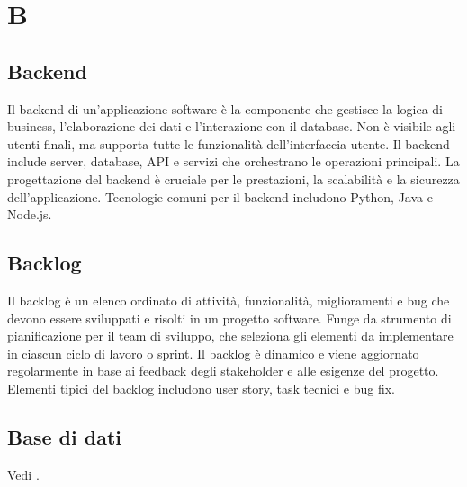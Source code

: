 \section{B}

\vspace{2em}
\subsection*{Backend}
\par Il backend di un'applicazione software è la componente che gestisce la logica di business, l'elaborazione dei dati e l'interazione con il database. Non è visibile agli utenti finali, ma supporta tutte le funzionalità dell'interfaccia utente. Il backend include server, database, API e servizi che orchestrano le operazioni principali. La progettazione del backend è cruciale per le prestazioni, la scalabilità e la sicurezza dell'applicazione. Tecnologie comuni per il backend includono Python, Java e Node.js.

\vspace{2em}
\subsection*{Backlog}
\par Il backlog è un elenco ordinato di attività, funzionalità, miglioramenti e bug che devono essere sviluppati e risolti in un progetto software. Funge da strumento di pianificazione per il team di sviluppo, che seleziona gli elementi da implementare in ciascun ciclo di lavoro o sprint. Il backlog è dinamico e viene aggiornato regolarmente in base ai feedback degli stakeholder e alle esigenze del progetto. Elementi tipici del backlog includono user story, task tecnici e bug fix.

\vspace{2em}
\subsection*{Base di dati}
\par Vedi .

